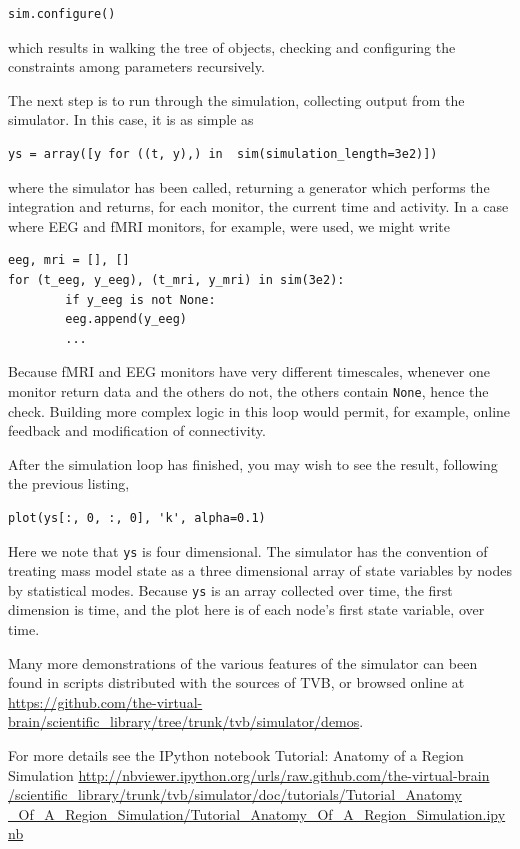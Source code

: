 \begin{lstlisting}
sim.configure()
\end{lstlisting}

\noindent which results in walking the tree of objects, checking and 
configuring the constraints among parameters recursively.

The next step is to run through the simulation, collecting
output from the simulator. In this case, it is as simple as

\begin{lstlisting}
ys = array([y for ((t, y),) in  sim(simulation_length=3e2)])
\end{lstlisting}

\noindent where the simulator has been called, returning a 
generator which performs the integration and returns, for each
monitor, the current time and activity. In a case where EEG 
and fMRI monitors, for example, were used, we might write

\begin{lstlisting}
eeg, mri = [], []
for (t_eeg, y_eeg), (t_mri, y_mri) in sim(3e2):
		if y_eeg is not None:
		eeg.append(y_eeg)
		...
\end{lstlisting}

\noindent Because fMRI and EEG monitors have very different
timescales, whenever one monitor return data and the others do
not, the others contain \texttt{None}, hence the check. Building
more complex logic in this loop would permit, for example, online
feedback and modification of connectivity. 

After the simulation loop has finished, you may wish to see the
result, following the previous listing, 

\begin{lstlisting}
plot(ys[:, 0, :, 0], 'k', alpha=0.1)
\end{lstlisting}

\noindent Here we note that \texttt{ys} is four dimensional. The 
simulator has the convention of treating  mass model state as a
three dimensional array of state variables by nodes by statistical
modes. Because \texttt{ys} is an array collected over time, the first
dimension is time, and the plot here is of each node's first state
variable, over time.

Many more demonstrations of the various features of the simulator
can been found in scripts distributed with the sources of TVB, or 
browsed online at \url{https://github.com/the-virtual-brain/scientific_library/tree/trunk/tvb/simulator/demos}.

For more details see the IPython notebook Tutorial: Anatomy of a Region Simulation 
\url{http://nbviewer.ipython.org/urls/raw.github.com/the-virtual-brain
/scientific_library/trunk/tvb/simulator/doc/tutorials/Tutorial_Anatomy
_Of_A_Region_Simulation/Tutorial_Anatomy_Of_A_Region_Simulation.ipynb}


%
